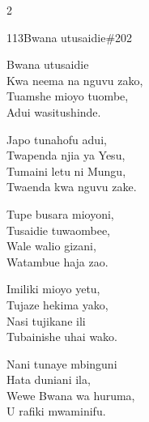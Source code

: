 \documentclass{article}
\begin{document}
\begin{multicols}{2}
\begin{hymn}{113}{Bwana utusaidie}{\#202}
\begin{stanza}
Bwana utusaidie\\
Kwa neema na nguvu zako,\\
Tuamshe mioyo tuombe,\\
Adui wasitushinde.
\end{stanza}
\begin{chorus}
Japo tunahofu adui,\\
Twapenda njia ya Yesu,\\
Tumaini letu ni Mungu,\\
Twaenda kwa nguvu zake.
\end{chorus}
\begin{stanza}
Tupe busara mioyoni,\\
Tusaidie tuwaombee,\\
Wale walio gizani,\\
Watambue haja zao.
\end{stanza}
\begin{stanza}
Imiliki mioyo yetu,\\
Tujaze hekima yako,\\
Nasi tujikane ili\\
Tubainishe uhai wako.
\end{stanza}
\begin{stanza}
Nani tunaye mbinguni\\
Hata duniani ila,\\
Wewe Bwana wa huruma,\\
U rafiki mwaminifu.
\end{stanza}
\end{hymn}


\end{multicols}
\end{document}
